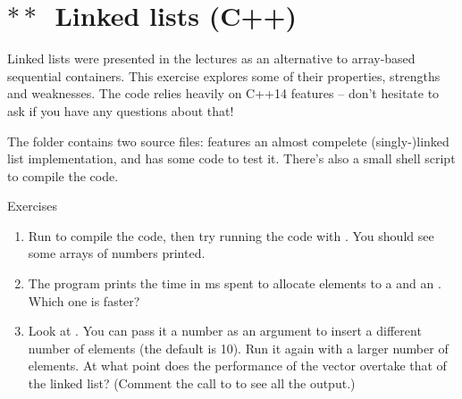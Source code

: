 \documentclass[12pt]{article}
\begin{document}
\clearpage
\section{$\ast\ast$~Linked lists (C++)}

Linked lists were presented in the lectures as an alternative to array-based sequential containers. This exercise explores some of their properties, strengths and weaknesses. The code relies heavily on \mbox{C++14} features -- don't hesitate to ask if you have any questions about that!

The folder  contains two source files:  features an almost compelete (singly-)linked list implementation, and  has some code to test it. There's also a small shell script to compile the code.
%
\begin{mybox}{Exercises}
    \begin{enumerate}
        \item Run  to compile the code, then try running the code with . You should see some arrays of numbers printed.
        \item The program prints the time in ms spent to allocate elements to a  and an . Which one is faster?
        \item Look at . You can pass it a number as an argument to insert a different number of elements (the default is 10). Run it again with a larger number of elements. At what point does the performance of the vector overtake that of the linked list? (Comment the call to  to see all the output.)
    \end{enumerate}
\end{mybox}
\end{document}
